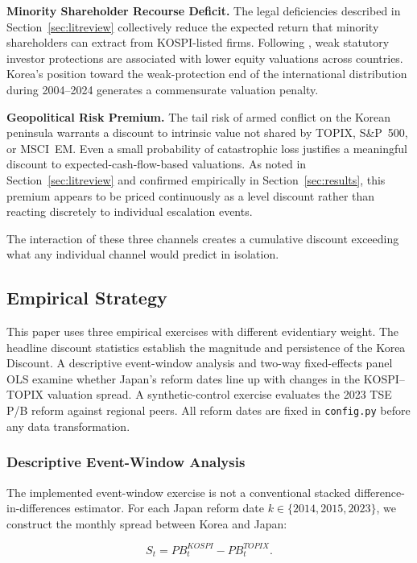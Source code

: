 \documentclass[12pt]{article}
\begin{document}
\textbf{Minority Shareholder Recourse Deficit.} The legal deficiencies described in
Section~\ref{sec:litreview} collectively reduce the expected return that minority shareholders
can extract from KOSPI-listed firms. Following \citet{porta1998, porta2002}, weak statutory
investor protections are associated with lower equity valuations across countries. Korea's
position toward the weak-protection end of the international distribution during 2004--2024
generates a commensurate valuation penalty.

\textbf{Geopolitical Risk Premium.} The tail risk of armed conflict on the Korean peninsula
warrants a discount to intrinsic value not shared by TOPIX, S\&P~500, or MSCI~EM. Even a
small probability of catastrophic loss justifies a meaningful discount to expected-cash-flow-based
valuations. As noted in Section~\ref{sec:litreview} and confirmed empirically in
Section~\ref{sec:results}, this premium appears to be priced continuously as a level discount
rather than reacting discretely to individual escalation events.

The interaction of these three channels creates a cumulative discount exceeding what any
individual channel would predict in isolation.

\subsection{Empirical Strategy}

This paper uses three empirical exercises with different evidentiary weight. The headline
discount statistics establish the magnitude and persistence of the Korea Discount. A
descriptive event-window analysis and two-way fixed-effects panel OLS examine whether Japan's
reform dates line up with changes in the KOSPI--TOPIX valuation spread. A synthetic-control
exercise evaluates the 2023 TSE P/B reform against regional peers. All reform dates are fixed
in \texttt{config.py} before any data transformation.

\subsubsection{Descriptive Event-Window Analysis}

The implemented event-window exercise is not a conventional stacked difference-in-differences
estimator. For each Japan reform date $k \in \{2014, 2015, 2023\}$, we construct the monthly
spread between Korea and Japan:

\begin{equation}
  S_t = PB^{KOSPI}_t - PB^{TOPIX}_t .
  \label{eq:spread}
\end{equation}
\end{document}
